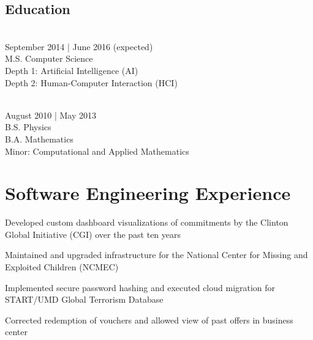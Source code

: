 \documentclass{onkursen-resume}
\begin{document}
\begin{multicols}{2}

\section*{Education}

\\
September 2014 | June 2016 (expected)\\
M.S. Computer Science\\
Depth 1: Artificial Intelligence (AI)\\
Depth 2: Human-Computer Interaction (HCI)\\

\vspace{6mm}

\\
August 2010 | May 2013\\
B.S. Physics\\
B.A. Mathematics\\
Minor: Computational and Applied Mathematics

\end{multicols}

\vspace{-1mm}

\hr

\section*{Software Engineering Experience}

\begin{itemize*}
\item Developed custom dashboard visualizations of commitments by the Clinton Global Initiative (CGI) over the past ten years
\item Maintained and upgraded infrastructure for the National Center for Missing and Exploited Children (NCMEC)
\item Implemented secure password hashing and executed cloud migration for START/UMD Global Terrorism Database
\end{itemize*}

\begin{itemize*}
\item Corrected redemption of vouchers and allowed view of past offers in business center
\end{itemize*}
\end{document}
